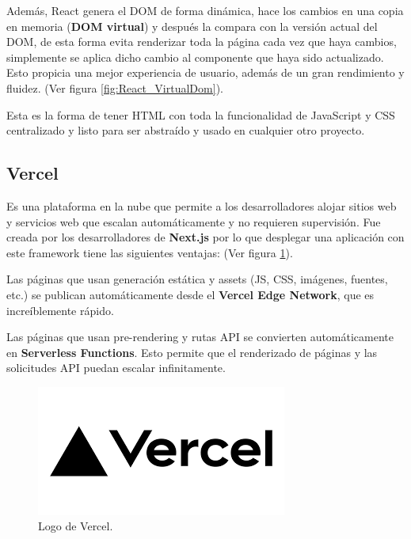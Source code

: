 \documentclass[12pt,twoside,titlepage]{report}
\begin{document}
Además, React genera el DOM de forma dinámica, hace los cambios en una copia en memoria (\textbf{DOM virtual}) y después la compara con la versión actual del DOM, de esta forma evita renderizar toda la página cada vez que haya cambios, simplemente se aplica dicho cambio al componente que haya sido actualizado. Esto propicia una mejor experiencia de usuario, además de un gran rendimiento y fluidez.
(Ver figura \ref{fig:React_VirtualDom}).

Esta es la forma de tener HTML con toda la funcionalidad de JavaScript y CSS centralizado y listo para ser abstraído y usado en cualquier otro proyecto.

\subsection{Vercel}

Es una plataforma en la nube que permite a los desarrolladores alojar sitios web y servicios web que escalan automáticamente y no requieren supervisión. Fue creada por los desarrolladores de \textbf{Next.js} por lo que desplegar una aplicación con este framework tiene las siguientes ventajas:
(Ver figura \ref{fig:VercelLogo}).

\begin{compactitem}
    \item Las páginas que usan generación estática y assets (JS, CSS, imágenes, fuentes, etc.) se publican automáticamente desde el \textbf{Vercel Edge Network}, que es increíblemente rápido.
    \item Las páginas que usan pre-rendering y rutas API se convierten automáticamente en \textbf{Serverless Functions}. Esto permite que el renderizado de páginas y las solicitudes API puedan escalar infinitamente.
\end{compactitem}

\begin{figure}[H]
    \centering
    \includegraphics[scale=0.5]{Vercel/Vercel}
    \caption{Logo de Vercel.}
    \label{fig:VercelLogo}
\end{figure}
\end{document}
